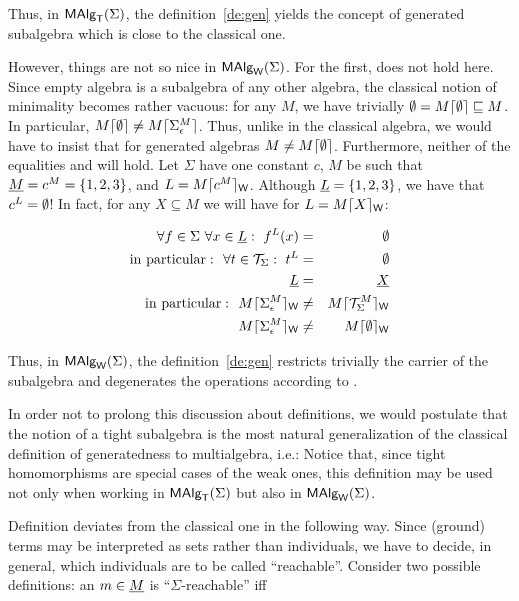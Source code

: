 \documentclass[10pt]{article}
\begin{document}
Thus, in $\mbox{\rm\sf MAlg}_{\sf T}(\Sigma)$, the definition~\ref{de:gen} yields the concept of
generated subalgebra which is close to the classical one.

However, things are not so nice in $\mbox{\rm\sf MAlg}_{\sf W}(\Sigma)$. For the first, 
does not hold here. Since empty algebra is a subalgebra of any other
algebra, the classical notion of minimality becomes rather vacuous:
for any $M$, we have trivially $\emptyset=M\lceil \emptyset \rceil\mathrel{\sqsubseteq} M$. In particular,
$M\lceil \emptyset \rceil\not= M\lceil \Sigma_{\epsilon}^M \rceil$.  Thus, unlike in the classical
algebra, we would have to insist that for generated algebras
$M\not=M\lceil \emptyset \rceil$.  Furthermore, neither of the equalities 
and  will hold. Let $\Sigma$ have one constant $c$, $M$ be
such that $\underline {M}=c^M=\{1,2,3\}$, and $L=M\lceil c^M \rceil_{\sf W}$. Although
$\underline {L}=\{1,2,3\}$, we have that $c^L=\emptyset$! In fact, for any
$X\subseteq M$ we will have for $L = M\lceil X \rceil_{\sf W}$:

\begin{eqnarray}
\forall f\in\Sigma\ \forall x\in\underline {L} :\ f^L(x) 
& = & \emptyset \label{eq:Lb} \\
{\rm in\ particular:\ \ }\forall t\in{\cal T}_{\Sigma} :\ t^L 
& = & \emptyset \nonumber \\
\underline {L} 
& = & \underline {X} \label{eq:La} \\ 
{\rm in\ particular:\ \ }M\lceil \Sigma_{\epsilon}^M \rceil_{\sf W} 
& \not= & M\lceil {\cal T}_{\Sigma}^M \rceil_{\sf W}  \nonumber \\
M\lceil \Sigma_{\epsilon}^M \rceil_{\sf W} 
& \not= & M\lceil \emptyset \rceil_{\sf W}  \nonumber 
\end{eqnarray}

Thus, in $\mbox{\rm\sf MAlg}_{\sf W}(\Sigma)$, the definition~\ref{de:gen} restricts trivially the
carrier of the subalgebra and degenerates the operations according to
.

In order not to prolong this discussion about definitions, we would
postulate that the notion of a tight subalgebra is the most natural
generalization of the classical definition of generatedness to
multialgebra, i.e.:  Notice that, since tight homomorphisms are special
cases of the weak ones, this definition may be used not only when
working in $\mbox{\rm\sf MAlg}_{\sf T}(\Sigma)$ but also in $\mbox{\rm\sf MAlg}_{\sf W}(\Sigma)$.

Definition  deviates from the classical one in the
following way.  Since (ground) terms may be interpreted as sets rather
than individuals, we have to decide, in general, which individuals are
to be called ``reachable''.  Consider two possible definitions: an
$m\in\underline {M}$ is ``$\Sigma$-reachable'' iff
\end{document}
